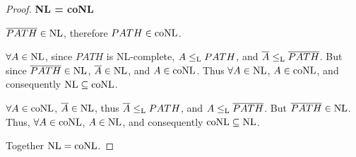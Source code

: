 \begin{mdframed}
\begin{proof}
\medskip
\textbf{NL = coNL}

$\overline{PATH} \in \text{NL}$, therefore $PATH \in \text{coNL}$.

$\forall A \in \text{NL}$, since $PATH$ is NL-complete, $A \leq_{\text{L}} PATH$, and $\overline{A} \leq_{\text{L}} \overline{PATH}$. But since $\overline{PATH} \in \text{NL}$, $\overline{A} \in \text{NL}$, and $A \in \text{coNL}$. Thus $\forall A \in \text{NL}$, $A \in \text{coNL}$, and consequently $\text{NL} \subseteq \text{coNL}$.

$\forall A \in \text{coNL}$, $\overline{A} \in \text{NL}$, thus $\overline{A} \leq_{\text{L}} PATH$, and $A \leq_{\text{L}} \overline{PATH}$. But $\overline{PATH} \in \text{NL}$. Thus, $\forall A \in \text{coNL}$, $A \in \text{NL}$, and consequently $\text{coNL} \subseteq \text{NL}$.

Together $\text{NL} = \text{coNL}$.
\end{proof}
\end{mdframed}